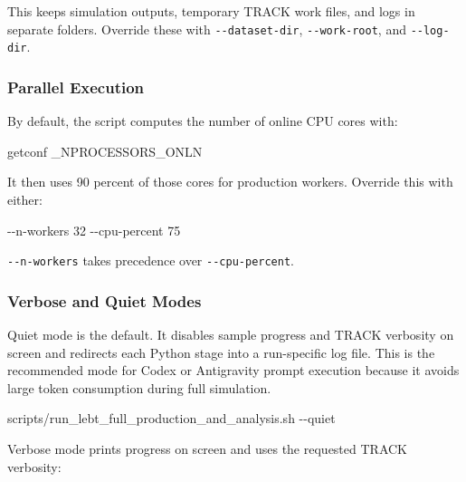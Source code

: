 \documentclass[
]{article}
\newenvironment{Shaded}{}{}
\newcommand{\AttributeTok}[1]{\textcolor[rgb]{0.49,0.56,0.16}{#1}}
\newcommand{\ExtensionTok}[1]{#1}
\newcommand{\NormalTok}[1]{#1}
\begin{document}
This keeps simulation outputs, temporary TRACK work files, and logs in
separate folders. Override these with \texttt{-\/-dataset-dir},
\texttt{-\/-work-root}, and \texttt{-\/-log-dir}.

\hypertarget{parallel-execution}{%
\subsubsection{Parallel Execution}\label{parallel-execution}}

By default, the script computes the number of online CPU cores with:

\begin{Shaded}
\begin{Highlighting}[]
\ExtensionTok{getconf}\NormalTok{ \_NPROCESSORS\_ONLN}
\end{Highlighting}
\end{Shaded}

It then uses 90 percent of those cores for production workers. Override
this with either:

\begin{Shaded}
\begin{Highlighting}[]
\ExtensionTok{{-}{-}n{-}workers}\NormalTok{ 32}
\ExtensionTok{{-}{-}cpu{-}percent}\NormalTok{ 75}
\end{Highlighting}
\end{Shaded}

\texttt{-\/-n-workers} takes precedence over \texttt{-\/-cpu-percent}.

\hypertarget{verbose-and-quiet-modes}{%
\subsubsection{Verbose and Quiet Modes}\label{verbose-and-quiet-modes}}

Quiet mode is the default. It disables sample progress and TRACK
verbosity on screen and redirects each Python stage into a run-specific
log file. This is the recommended mode for Codex or Antigravity prompt
execution because it avoids large token consumption during full
simulation.

\begin{Shaded}
\begin{Highlighting}[]
\ExtensionTok{scripts/run\_lebt\_full\_production\_and\_analysis.sh} \AttributeTok{{-}{-}quiet}
\end{Highlighting}
\end{Shaded}

Verbose mode prints progress on screen and uses the requested TRACK
verbosity:
\end{document}
